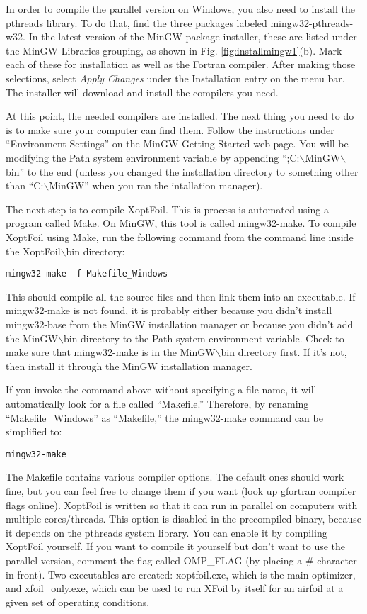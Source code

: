 \documentclass[11pt]{article}
\begin{document}
In order to compile the parallel version on Windows, you also need to install the pthreads
library.  To do that, find the three packages labeled mingw32-pthreads-w32.  In the latest
version of the MinGW package installer, these are listed under the MinGW Libraries
grouping, as shown in Fig. \ref{fig:installmingw1}(b).  Mark each of these for
installation as well as the Fortran compiler. After making those selections, select
\textit{Apply Changes} under the Installation entry on the menu bar.  The installer will 
download and install the compilers you need.

At this point, the needed compilers are installed.  The next thing you need to do is to
make sure your computer can find them.  Follow the instructions under ``Environment
Settings'' on the MinGW Getting Started web page.  You will be modifying the Path
system environment variable by appending ``;C:$\backslash$MinGW$\backslash$bin''
to the end (unless you changed the installation directory to something other than
``C:$\backslash$MinGW'' when you ran the intallation manager).

The next step is to compile XoptFoil. This is process is automated using a program called
Make.  On MinGW, this tool is called mingw32-make.  To compile XoptFoil using Make, run the
following command from the command line inside the XoptFoil$\backslash$bin directory:

\begin{verbatim}
mingw32-make -f Makefile_Windows
\end{verbatim}

This should compile all the source files and then link them into an executable.  If
mingw32-make is not found, it is probably either because you didn't install mingw32-base
from the MinGW installation manager or because you didn't add the MinGW$\backslash$bin
directory to the Path system environment variable.  Check to make sure that mingw32-make
is in the MinGW$\backslash$bin directory first.  If it's not, then install it through the
MinGW installation manager.

If you invoke the command above without specifying a file name, it will automatically look
for a file called ``Makefile.''  Therefore, by renaming ``Makefile\_Windows'' as
``Makefile,'' the mingw32-make command can be simplified to:

\begin{verbatim}
mingw32-make
\end{verbatim}

The Makefile contains various compiler options.  The default ones should work fine, but
you can feel free to change them if you want (look up gfortran compiler flags online).
XoptFoil is written so that it can run in parallel on computers with multiple
cores/threads.  This option is disabled in the precompiled binary, because it depends on
the pthreads system library.  You can enable it by compiling XoptFoil yourself.  If you
want to compile it yourself but don't want to use the parallel version, comment the flag
called OMP\_FLAG (by placing a \# character in front). Two executables are
created: xoptfoil.exe, which is the main optimizer, and xfoil\_only.exe, which can be 
used to run XFoil by itself for an airfoil at a given set of operating conditions.
\end{document}
